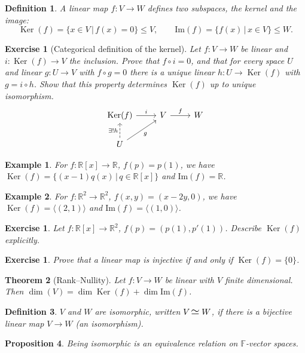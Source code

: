 \documentclass[12pt]{article}
\newcommand{\iso}{\scaleobj{1.3}{\hspace{1pt}{\simeq} \hspace{2pt}}}
\newcommand{\double}{\hspace{2pt}}
\DeclareMathOperator{\Ker}{Ker}
\theoremstyle{breakplain}
\newtheorem{theorem}{Theorem}[section]
\newtheorem{prop}[theorem]{Proposition}
\theoremstyle{breakdef}
\newtheorem{definition}[theorem]{Definition}
\newtheorem*{example}{Example}
\newtheorem{ex}[subsubsection]{Exercise}
\theoremstyle{remark}
\begin{document}
\begin{definition}
    A linear map $f:V\to W$ defines two subspaces, the \emph{kernel} and the \emph{image}:
    \[\Ker(f)=\{x\in V\double | \double f(x)=0 \}\leq V,\qquad \mathrm{Im}(f)=\{f(x) \double | \double x\in V \}\leq W.\]
\end{definition}
\begin{ex}[Categorical definition of the kernel]
    Let $f:V\to W$ be linear and $i:\Ker(f)\to V$ the inclusion. Prove that $f\circ i=0$, and that for every space $U$ and linear $g:U\to V$ with $f \circ g=0$ there is a unique linear $h:U\to\Ker(f)$ with $g=i\circ h$. Show that this property determines $\Ker(f)$ up to unique isomorphism.
    \[\begin{tikzcd}
	{\Ker(f)} & V & W \\
	U
	\arrow["i", from=1-1, to=1-2]
	\arrow["f", from=1-2, to=1-3]
	\arrow["{\exists !h}", dashed, from=2-1, to=1-1]
	\arrow["g"', from=2-1, to=1-2]
    \end{tikzcd}\]
\end{ex}
\begin{example}
    For $f:\mathbb{R}[x]\to \mathbb{R}$, $f(p)=p(1)$, we have $\Ker(f)=\{ (x-1)q(x) \double | \double q\in \mathbb{R}[x] \}$ and $\mathrm{Im}(f)=\mathbb{R}$.
\end{example}
\begin{example}
    For $f:\mathbb{R}^2\to \mathbb{R}^2$, $f(x,y)=(x-2y,0)$, we have $\Ker(f)=\langle (2,1)\rangle$ and $\mathrm{Im}(f)=\langle (1,0)\rangle$.
\end{example}
\begin{ex}
    Let $f:\mathbb{R}[x]\to \mathbb{R}^2$, $f(p)=(p(1),p'(1))$. Describe $\Ker(f)$ explicitly.
\end{ex}
\begin{ex}
    Prove that a linear map is injective if and only if $\Ker(f)=\{0\}$.
\end{ex}
\begin{theorem}[Rank--Nullity]
    Let $f:V\to W$ be linear with $V$ finite dimensional. Then $\dim(V)=\dim\Ker(f)+\dim\mathrm{Im}(f)$.
\end{theorem}
\begin{definition}
    $V$ and $W$ are \emph{isomorphic}, written $V\iso W$, if there is a bijective linear map $V\to W$ (an \emph{isomorphism}).
\end{definition}
\begin{prop}
    Being isomorphic is an equivalence relation on $\mathbb{F}$-vector spaces.
\end{prop}
\end{document}
